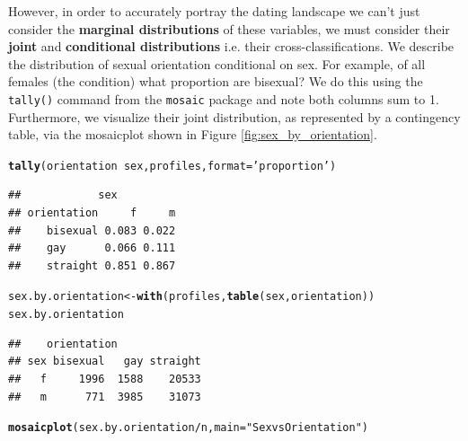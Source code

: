 \documentclass{article}\usepackage[]{graphicx}\usepackage[]{color}
\makeatletter
\newcommand{\hlstr}[1]{\textcolor[rgb]{0.192,0.494,0.8}{#1}}%
\newcommand{\hlopt}[1]{\textcolor[rgb]{0,0,0}{#1}}%
\newcommand{\hlstd}[1]{\textcolor[rgb]{0.345,0.345,0.345}{#1}}%
\newcommand{\hlkwb}[1]{\textcolor[rgb]{0.69,0.353,0.396}{#1}}%
\newcommand{\hlkwc}[1]{\textcolor[rgb]{0.333,0.667,0.333}{#1}}%
\newcommand{\hlkwd}[1]{\textcolor[rgb]{0.737,0.353,0.396}{\textbf{#1}}}%
\newenvironment{kframe}{%
 \def\at@end@of@kframe{}%
 \ifinner\ifhmode%
  \def\at@end@of@kframe{\end{minipage}}%
  \begin{minipage}{\columnwidth}%
 \fi\fi%
 \def\FrameCommand##1{\hskip\@totalleftmargin \hskip-\fboxsep
 \colorbox{shadecolor}{##1}\hskip-\fboxsep
     \hskip-\linewidth \hskip-\@totalleftmargin \hskip\columnwidth}%
 \MakeFramed {\advance\hsize-\width
   \@totalleftmargin\z@ \linewidth\hsize
   \@setminipage}}%
 {\par\unskip\endMakeFramed%
 \at@end@of@kframe}
\newenvironment{knitrout}{}{} %
\makeatother
\begin{document}
However, in order to accurately portray the dating landscape we can't just consider the \textbf{marginal distributions} of these variables, we must consider their \textbf{joint} and \textbf{conditional distributions} i.e. their cross-classifications.  We describe the distribution of sexual orientation conditional on sex.  For example, of all females (the condition) what proportion are bisexual?  We do this using the \verb#tally()# command from the \verb#mosaic# package and note both columns sum to 1.  Furthermore, we visualize their joint distribution, as represented by a contingency table, via the mosaicplot shown in Figure \ref{fig:sex_by_orientation}.

\begin{knitrout}
\color{fgcolor}\begin{kframe}
\begin{alltt}
\hlkwd{tally}\hlstd{(orientation} \hlopt{~} \hlstd{sex, profiles,} \hlkwc{format}\hlstd{=}\hlstr{'proportion'}\hlstd{)}
\end{alltt}
\begin{verbatim}
##            sex
## orientation     f     m
##    bisexual 0.083 0.022
##    gay      0.066 0.111
##    straight 0.851 0.867
\end{verbatim}
\begin{alltt}
\hlstd{sex.by.orientation} \hlkwb{<-} \hlkwd{with}\hlstd{(profiles,} \hlkwd{table}\hlstd{(sex, orientation))}
\hlstd{sex.by.orientation}
\end{alltt}
\begin{verbatim}
##    orientation
## sex bisexual   gay straight
##   f     1996  1588    20533
##   m      771  3985    31073
\end{verbatim}
\begin{alltt}
\hlkwd{mosaicplot}\hlstd{(sex.by.orientation}\hlopt{/}\hlstd{n,} \hlkwc{main}\hlstd{=}\hlstr{"Sex vs Orientation"}\hlstd{)}
\end{alltt}
\end{kframe}\begin{figure}


\end{figure}
\end{knitrout}
\end{document}
